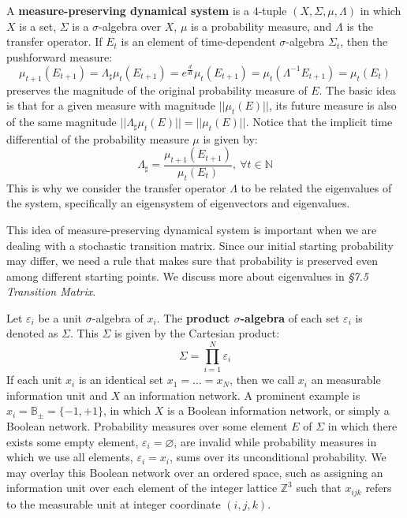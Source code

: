 \documentclass[10pt, a5paper, twoside, openright]{memoir}
\begin{document}
A \textbf{measure-preserving dynamical system} is a $4$-tuple $(X, \Sigma, \mu, \Lambda)$ in which $X$ is a set, $\Sigma$ is a $\sigma$-algebra over $X$, $\mu$ is a probability measure, and $\Lambda$ is the transfer operator. If $E_t$ is an element of time-dependent $\sigma$-algebra $\Sigma_t$, then the pushforward measure:
$$\mu_{t+1}(E_{t+1}) = \Lambda_{\sharp} \mu_{t}(E_{t+1}) = e^{\frac{d}{dt}}\mu_t(E_{t+1}) = \mu_t(\Lambda^{-1} E_{t+1}) = \mu_t(E_t)$$
preserves the magnitude of the original probability measure of $E$. The basic idea is that for a given measure with magnitude $||\mu_t(E)||$, its future measure is also of the same magnitude $||\Lambda_{\sharp} \mu_t(E)|| = ||\mu_t(E)||$. Notice that the implicit time differential of the probability measure $\mu$ is given by:
$$\Lambda_\sharp = \frac{\mu_{t+1}(E_{t+1})}{\mu_t(E_t)}, \ \forall t \in \mathbb N$$
This is why we consider the transfer operator $\Lambda$ to be related the eigenvalues of the system, specifically an eigensystem of eigenvectors and eigenvalues. 

This idea of measure-preserving dynamical system is important when we are dealing with a stochastic transition matrix. Since our initial starting probability may differ, we need a rule that makes sure that probability is preserved even among different starting points. We discuss more about eigenvalues in \textit{\S 7.5 Transition Matrix}.

Let $\varepsilon_i$ be a unit $\sigma$-algebra of $x_i$. The \textbf{product $\sigma$-algebra} of each set $\varepsilon_i$ is denoted as $\Sigma$. This $\Sigma$ is given by the Cartesian product:
$$\Sigma = \prod\limits_{i=1}^N \varepsilon_i$$
If each unit $x_i$ is an identical set $x_1 = ... = x_N$, then we call $x_i$ an measurable information unit and $X$ an information network. A prominent example is $x_i = \mathbb B_\pm = \{ -1, +1\}$, in which $X$ is a Boolean information network, or simply a Boolean network. Probability measures over some element $E$ of $\Sigma$ in which there exists some empty element, $\varepsilon_i = \varnothing$, are invalid while probability measures in which we use all elements, $\varepsilon_i = x_i$, sums over its unconditional probability. We may overlay this Boolean network over an ordered space, such as assigning an information unit over each element of the integer lattice $\mathbb Z^3$ such that $x_{ijk}$ refers to the measurable unit at integer coordinate $(i,j,k)$.
\end{document}
